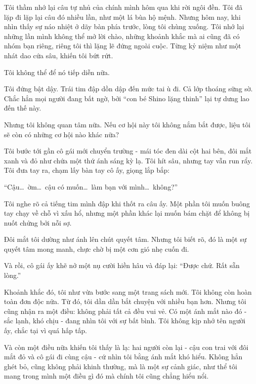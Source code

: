\documentclass[../main.tex]{subfiles}
\begin{document}
Tôi thầm nhớ lại câu tự nhủ của chính mình hôm qua khi rời ngôi đền. Tôi đã lặp đi lặp lại câu đó nhiều lần, như một lá bùa hộ mệnh. Nhưng hôm nay, khi nhìn thấy sự náo nhiệt ở dãy bàn phía trước, lòng tôi chùng xuống. Tôi nhớ lại những lần mình không thể mở lời chào, những khoảnh khắc mà ai cũng đã có nhóm bạn riêng, riêng tôi thì lặng lẽ đứng ngoài cuộc. Từng kỷ niệm như một nhát dao cứa sâu, khiến tôi bứt rứt.

Tôi không thể để nó tiếp diễn nữa.

Tôi đứng bật dậy. Trái tim đập dồn dập đến mức tai ù đi. Cả lớp thoáng sững sờ. Chắc hẳn mọi người đang bất ngờ, bởi ``con bé Shino lặng thinh'' lại tự dưng lao đến thế này.

Nhưng tôi không quan tâm nữa. Nếu cơ hội này tôi không nắm bắt được, liệu tôi sẽ còn có những cơ hội nào khác nữa?

Tôi bước tới gần cô gái mới chuyển trường - mái tóc đen dài cột hai bên, đôi mắt xanh và đỏ như chứa một thứ ánh sáng kỳ lạ. Tôi hít sâu, nhưng tay vẫn run rẩy. Tôi đưa tay ra, chạm lấy bàn tay cô ấy, giọng lắp bắp:

``Cậu\dots\ ờm\dots\ cậu có muốn\dots\ làm bạn với mình\dots\ không?''


Tôi nghe rõ cả tiếng tim mình đập khi thốt ra câu ấy. Một phần tôi muốn buông tay chạy về chỗ vì xấu hổ, nhưng một phần khác lại muốn bám chặt để không bị nuốt chửng bởi nỗi sợ.

Đôi mắt tôi dường như ánh lên chút quyết tâm. Nhưng tôi biết rõ, đó là một sự quyết tâm mong manh, chực chờ bị một cơn gió nhẹ cuốn đi.

Và rồi, cô gái ấy khẽ nở một nụ cười hiền hâu và đáp lại: ``Được chứ. Rất sẵn lòng.''

Khoảnh khắc đó, tôi như vừa bước sang một trang sách mới. Tôi không còn hoàn toàn đơn độc nữa. Từ đó, tôi dần dần bắt chuyện với nhiều bạn hơn. Nhưng tôi cũng nhận ra một điều: không phải tất cả đều vui vẻ. Có một ánh mắt nào đó - sắc lạnh, khó chịu - đang nhìn tôi với sự bất bình. Tôi không kịp nhớ tên người ấy, chắc tại vì quá hấp tấp.

Và còn một điều nữa khiến tôi thấy là lạ: hai người còn lại - cậu con trai với đôi mắt đỏ và cô gái đi cùng cậu - cứ nhìn tôi bằng ánh mắt khó hiểu. Không hẳn ghét bỏ, cũng không phải khinh thường, mà là một sự cảnh giác, như thể tôi mang trong mình một điều gì đó mà chính tôi cũng chẳng hiểu nổi.

\end{document}
